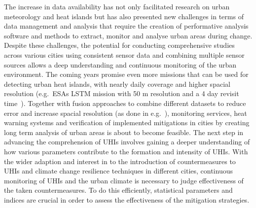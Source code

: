 \documentclass[12pt,a4paper, english,twoside]{scrartcl}
\begin{document}
  The increase in data availability has not only facilitated research on urban meteorology and heat islands but has also presented new challenges in terms of data management and analysis that require the creation of performative analysis software and methods to extract, monitor and analyse urban areas during change.
  Despite these challenges, the potential for conducting comprehensive studies across various cities using consistent sensor data and combining multiple sensor sources allows a deep understanding and continuous monitoring of the urban environment.
  The coming years promise even more missions that can be used for detecting urban heat islands, with nearly daily coverage and higher spacial resolution (e.g.~ESAs LSTM mission with 50 m resolution and a 4 day revisit time~\cite{CEOS2024}). 
  Together with fusion approaches to combine different datasets to reduce error and increase spacial resolution (as done in e.g.~\cite{CampsValls2009}), monitoring services, heat warning systems and verification of implemented mitigations in cities by creating long term analysis of urban areas is about to become feasible.
  The next step in advancing the comprehension of \glspl{UHI} involves gaining a deeper understanding of how various parameters contribute to the formation and intensity of \glspl{UHI}.
  With the wider adaption and interest in to the introduction of countermeasures to \glspl{UHI} and climate change resilience techniques in different cities, continuous monitoring of \glspl{UHI} and the urban climate is necessary to judge effectiveness of the taken countermeasures.
  To do this efficiently, statistical parameters and indices are crucial in order to assess the effectiveness of the mitigation strategies. 
\end{document}
